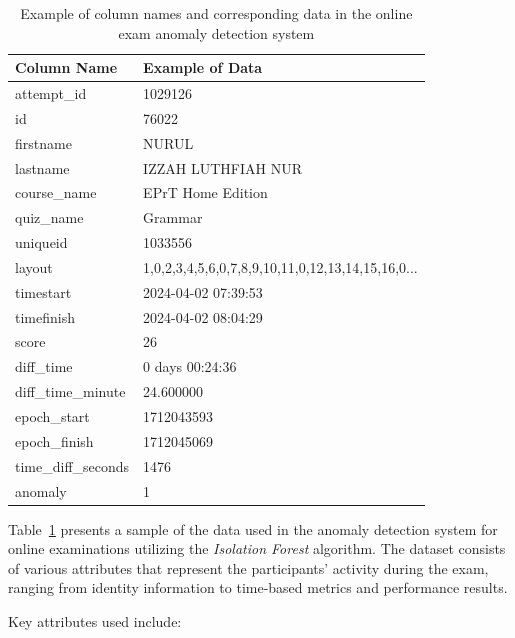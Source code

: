 \begin{table}[H]
	\centering
	\renewcommand{\arraystretch}{1.3}
	\begin{tabular}{|p{4cm}|p{10cm}|}
		\hline
		\textbf{Column Name} & \textbf{Example of Data} \\
		\hline
		attempt\_id & 1029126 \\
		\hline
		id & 76022 \\
		\hline
		firstname & NURUL \\
		\hline
		lastname & IZZAH LUTHFIAH NUR \\
		\hline
		course\_name & EPrT Home Edition \\
		\hline
		quiz\_name & Grammar \\
		\hline
		uniqueid & 1033556 \\
		\hline
		layout & 1,0,2,3,4,5,6,0,7,8,9,10,11,0,12,13,14,15,16,0... \\
		\hline
		timestart & 2024-04-02 07:39:53 \\
		\hline
		timefinish & 2024-04-02 08:04:29 \\
		\hline
		score & 26 \\
		\hline
		diff\_time & 0 days 00:24:36 \\
		\hline
		diff\_time\_minute & 24.600000 \\
		\hline
		epoch\_start & 1712043593 \\
		\hline
		epoch\_finish & 1712045069 \\
		\hline
		time\_diff\_seconds & 1476 \\
		\hline
		anomaly & 1 \\
		\hline
	\end{tabular}
	\caption{Example of column names and corresponding data in the online exam anomaly detection system}
	\label{tab:anomaly_data}
\end{table}

Table~\ref{tab:anomaly_data} presents a sample of the data used in the anomaly detection system for online examinations utilizing the \textit{Isolation Forest} algorithm. The dataset consists of various attributes that represent the participants' activity during the exam, ranging from identity information to time-based metrics and performance results.

Key attributes used include:

